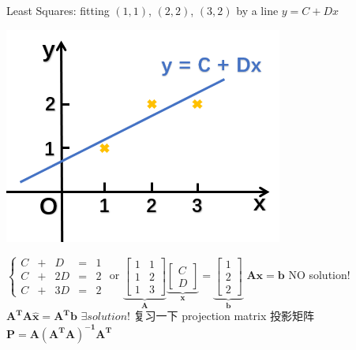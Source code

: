 \documentclass[12pt, a4paper]{article}
\begin{document}
{\noindent Least Squares: fitting $(1, 1)$, $(2, 2)$, $(3, 2)$ by a line $y = C + Dx$
\begin{center}
	\includegraphics[scale=0.8]{figures/S16-1.png}
\end{center}
\begin{math}
	\left\{
	\begin{array}{rclrcl}
		C & + & D & = & 1 \\
		C & + & 2D & = & 2 \\
		C & + & 3D & = & 2 
	\end{array}
	\right.
\end{math}
 or 
\begin{math}
	\underbrace{
		\begin{bmatrix}
			1 & 1 \\
			1 & 2 \\
			1 & 3 
		\end{bmatrix}
	}_{\mathbf{A}}
	\underbrace{
		\begin{bmatrix}
			C \\
			D 
		\end{bmatrix}
	}_{\mathbf{x}}
	 = 
	\underbrace{
		\begin{bmatrix}
			1 \\
			2 \\
			2 
		\end{bmatrix}
	}_{\mathbf{b}}
\end{math}
\newline
${\mathbf{A}}{\mathbf{x}} = {\mathbf{b}}$ \qquad\qquad NO solution!
\newline
${\mathbf{A^{T}}}{\mathbf{A}}{\mathbf{\hat{x}}} = {\mathbf{A^{T}}}{\mathbf{b}}$ \qquad $\exists solution$!
\vspace{31pt}
\newline
复习一下 projection matrix 投影矩阵
\newline
${\mathbf{P}} = {\mathbf{A}}{\mathbf{({\mathbf{A^{T}}}{\mathbf{A}})^{-1}}} {\mathbf{A^{T}}}$
}
\end{document}
